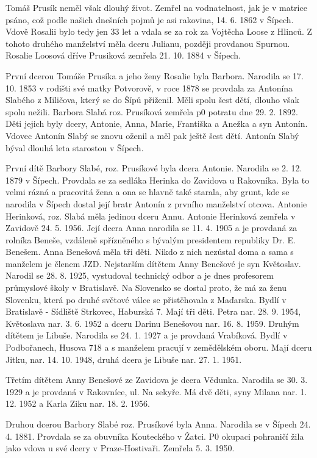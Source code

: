 \documentclass[../dejiny-rodu-prusiku.tex]{subfiles}
\begin{document}
Tomáš Prusík neměl však dlouhý život. Zemřel na vodnatelnost, jak je v matrice psáno, což podle našich dneš­ních pojmů je asi rakovina, 14. 6. 1862 v Šípech. Vdově Rosalii bylo tedy jen 33 let a vdala se za rok za Voj­těcha Loose z Hlinců. Z tohoto druhého manželství měla dceru Julianu, později provdanou Spurnou. Rosalie Loosová dříve Prusiková zemřela 21. 10. 1884 v Šípech.

První dcerou Tomáše Prusíka a jeho ženy Rosalie byla Barbora. Narodila se 17. 10. 1853 v rodišti své matky Potvorově, v roce 1878 se provdala za Antonína Slabého z Miličova, který se do Šípů přiženil. Měli spolu šest dětí, dlouho však spolu nežili. Barbora Slabá roz. Prusíková zemřela p0 potratu dne 29. 2. 1892. Děti jejich byly dcery, Antonie, Anna, Marie, Františka a Anežka a syn Antonín. Vdovec Antonín Slabý se znovu oženil a měl pak ještě šest dětí. Antonín Slabý býval dlouhá leta starostou v Šípech.

První dítě Barbory Slabé, roz. Prusíkové byla dcera Antonie. Narodila se 2. 12. 1879 v Šípech. Provdala se za sedláka Herinka do Zavidova u Rakovníka. Byla to velmi rázná a pracovitá žena a ona se hlavně také starala, aby grunt, kde se narodila v Šípech dostal její bratr Antonín z prvního manželství otcova. Antonie Herinková, roz. Slabá měla jedinou dceru Annu. Antonie Herinková zemřela v Zavidově 24. 5. 1956. Její dcera Anna narodila se 11. 4. 1905 a je provdaná za rolníka Beneše, vzdáleně spříz­něného s bývalým presidentem republiky Dr. E. Benešem. Anna Benešová měla tři děti. Nikdo z nich nezůstal doma a sama s manželem je členem JZD. Nejstarším dítětem Anny Benešové je syn Květoslav. Narodil se 28. 8. 1925, vystudoval technický odbor a je dnes profesorem průmyslo­vé školy v Bratislavě. Na Slovensko se dostal proto, že má za ženu Slovenku, která po druhé světové válce se přistě­hovala z Maďarska. Bydlí v Bratislavě - Sídliště Strkovec, Haburská 7. Mají tři děti. Petra nar. 28. 9. 1954, Květoslava nar. 3. 6. 1952 a dceru Darinu Benešovou nar. 16. 8. 1959. Druhým dítětem je Libuše. Narodila se 24. 1. 1927 a je provdaná Vrabíková. Bydlí v Podbořanech, Husova 718 a s manželem pracují v zemědělském oboru. Mají dceru Jitku, nar. 14. 10. 1948, druhá dcera je Libuše nar. 27. 1. 1951.

Třetím dítětem Anny Benešové ze Zavidova je dcera Vědunka. Narodila se 30. 3. 1929 a je provdaná v Rakovníce, ul. Na sekyře. Má dvě děti, syny Milana nar. 1. 12. 1952 a Karla Ziku nar. 18. 2. 1956.

Druhou dcerou Barbory Slabé roz. Prusíkové byla Anna. Narodila se v Šípech 24. 4. 1881. Provdala se za obuvníka Kouteckého v Žatci. P0 okupaci pohraničí žila jako vdova u své dcery v Praze-Hostivaři. Zemřela 5. 3. 1950.
\end{document}
